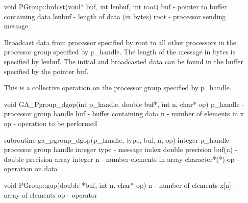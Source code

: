 \documentclass[12pt]{article}
\begin{document}
\begin{cxxapi}
void PGroup::brdcst(void* buf, int lenbuf, int root)
   buf            - pointer to buffer containing data                      
   lenbuf         - length of data (in bytes)                              \access{[input]}
   root           - processor sending message                              \access{[input]}
\end{cxxapi}

\begin{desc}

Broadcast data from processor specified by root to all other processors in the processor group specified by p_handle. The length of the message in bytes is specified by lenbuf. The initial and broadcasted data can be found in the buffer specified by the pointer buf.

This is a collective operation on the processor group specified by p_handle. 
\end{desc}


\begin{capi}
void GA_Pgroup_dgop(int p_handle, double buf*, int n, char* op)
   p_handle                      - processor group handle                  \access{[input]} 
   buf                           - buffer containing data                   
   n                             - number of elements in x                 \access{[input]} 
   op                            - operation to be performed               \access{[input]} 
\end{capi}

\begin{fapi}
subroutine ga_pgroup_dgop(p_handle, type, buf, n, op)
   integer p_handle              - processor group handle                  \access{[input]} 
   integer type                  - message index                           \access{[input]} 
   double precision buf(n)       - double precision array                   
   integer n                     - number elements in array                \access{[input]} 
   character*(*) op              - operation on data                       \access{[input]} 
\end{fapi}

\begin{cxxapi}
void PGroup::gop(double *buf, int n, char* op)
   n              - number of elements                                     \access{[input]}
   x[n]           - array of elements                                      
   op             - operator                                               \access{[input]}
\end{cxxapi}
\end{document}
